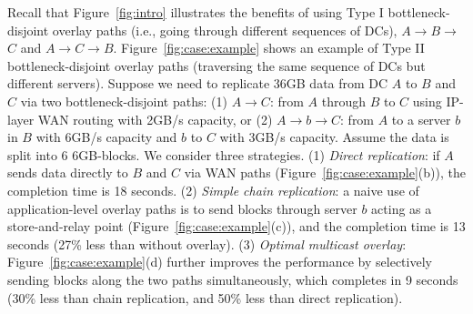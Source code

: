 Recall that Figure~\ref{fig:intro} illustrates the benefits of
using Type I bottleneck-disjoint overlay paths
(i.e., going through different sequences of DCs),
$A$$\rightarrow$$B$$\rightarrow$$C$ and
$A$$\rightarrow$$C$$\rightarrow$$B$.
Figure~\ref{fig:case:example} shows an example
of Type II bottleneck-disjoint overlay paths
(traversing the same sequence of DCs but different servers).
Suppose we need to replicate 36GB data from DC $A$
to $B$ and $C$ via two bottleneck-disjoint paths:
(1) $A$$\rightarrow$$C$:
from $A$ through $B$ to $C$ using IP-layer WAN routing with
2GB/s capacity, or
(2) $A$$\rightarrow$$b$$\rightarrow$$C$: from $A$ to a server
$b$ in $B$ with
6GB/s capacity and $b$ to $C$ with 3GB/s capacity.
Assume the data is split into 6 6GB-blocks.
We consider three strategies.
(1) {\em Direct replication}:
if $A$ sends data directly to $B$ and $C$ via WAN paths
(Figure~\ref{fig:case:example}(b)),
the completion time is 18 seconds.
(2) {\em Simple chain replication}:
a naive use of application-level overlay paths
is to send blocks through server $b$ acting as a
store-and-relay point
(Figure~\ref{fig:case:example}(c)),
and the completion time is 13 seconds (27\% less than without overlay).
(3) {\em Optimal multicast overlay}:
Figure~\ref{fig:case:example}(d) further improves the performance by
selectively sending blocks along the two paths simultaneously,
which completes in 9 seconds (30\% less than chain replication,
and 50\% less than direct replication).


